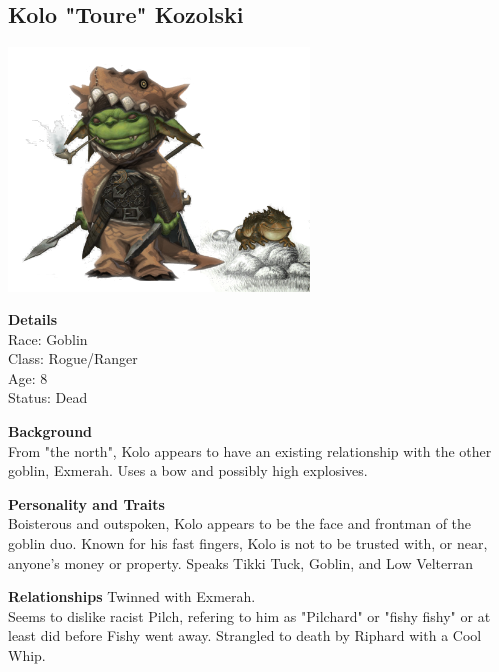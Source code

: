 \subsection{Kolo "Toure" Kozolski}
\begin{center}
\includegraphics[width=80mm]{./content/img/krokokolo.png}
\begin{figure}[h]
\end{figure}
\end{center}

\textbf{Details}\\
Race: Goblin\\
Class: Rogue/Ranger\\
Age: 8\\
Status: Dead\bigskip

\textbf{Background}\\
From "the north", Kolo appears to have an existing relationship with the other goblin, Exmerah. Uses a bow and possibly high explosives.\bigskip

\textbf{Personality and Traits}\\
Boisterous and outspoken, Kolo appears to be the face and frontman of the goblin duo.\smallskip
Known for his fast fingers, Kolo is not to be trusted with, or near, anyone's money or property.\smallskip
Speaks Tikki Tuck, Goblin, and Low Velterran\smallskip

\textbf{Relationships}
Twinned with Exmerah.\\
Seems to dislike racist Pilch, refering to him as "Pilchard" or "fishy fishy" or at least did before Fishy went away.\smallskip
Strangled to death by Riphard with a Cool Whip.

\clearpage